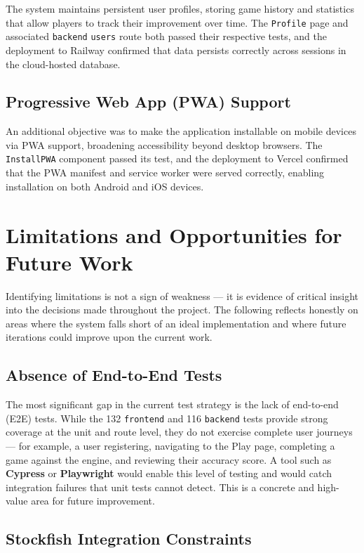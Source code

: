 The system maintains persistent user profiles, storing game history and statistics that allow players to track their improvement over time. The \texttt{Profile} page and associated \texttt{backend} \texttt{users} route both passed their respective tests, and the deployment to Railway confirmed that data persists correctly across sessions in the cloud-hosted database.

\subsection*{Progressive Web App (PWA) Support}

An additional objective was to make the application installable on mobile devices via PWA support, broadening accessibility beyond desktop browsers. The \texttt{InstallPWA} component passed its test, and the deployment to Vercel confirmed that the PWA manifest and service worker were served correctly, enabling installation on both Android and iOS devices.


\section{Limitations and Opportunities for Future Work}

Identifying limitations is not a sign of weakness — it is evidence of critical insight into the decisions made throughout the project. The following reflects honestly on areas where the system falls short of an ideal implementation and where future iterations could improve upon the current work.

\subsection*{Absence of End-to-End Tests}

The most significant gap in the current test strategy is the lack of end-to-end (E2E) tests. While the 132 \texttt{frontend} and 116 \texttt{backend} tests provide strong coverage at the unit and route level, they do not exercise complete user journeys — for example, a user registering, navigating to the Play page, completing a game against the engine, and reviewing their accuracy score. A tool such as \textbf{Cypress} or \textbf{Playwright} would enable this level of testing and would catch integration failures that unit tests cannot detect. This is a concrete and high-value area for future improvement.

\subsection*{Stockfish Integration Constraints}

